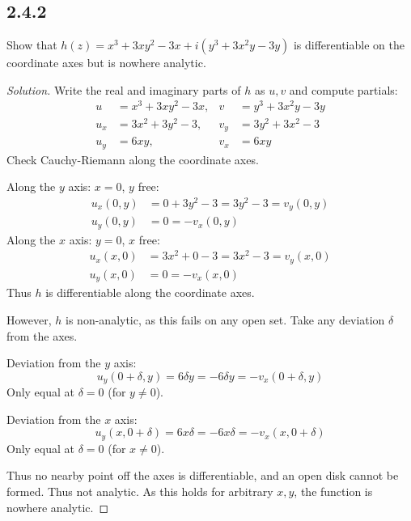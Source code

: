 \documentclass{article}
\newenvironment{solution}{
\begin{proof}[Solution]}{
\end{proof}}
\begin{document}
\subsection*{2.4.2}
Show that $h(z) = x^3 + 3xy^2 - 3x + i(y^3 + 3x^2y - 3y)$ is differentiable on
the coordinate axes but is nowhere analytic.
\begin{solution}
  Write the real and imaginary parts of $h$ as $u, v$ and compute partials:
  \begin{align*}
    u &= x^3 + 3xy^2 - 3x, & v &= y^3 + 3x^2y - 3y
    \\ u_x &= 3x^2 + 3y^2 - 3, & v_y &= 3y^2 + 3x^2 - 3
    \\ u_y &= 6xy, & v_x &= 6xy
  \end{align*}
  Check Cauchy-Riemann along the coordinate axes.

  Along the $y$ axis: $x = 0$, $y$ free:
  \begin{align*}
    u_x(0,y) &= 0 + 3y^2 - 3 = 3y^2 - 3 = v_y(0,y)
    \\ u_y(0,y) &= 0 = -v_x(0,y)
  \end{align*}
  Along the $x$ axis: $y = 0$, $x$ free:
  \begin{align*}
    u_x(x,0) &= 3x^2 + 0 - 3 = 3x^2 - 3 = v_y(x,0)
    \\ u_y(x,0) &= 0 = -v_x(x,0)
  \end{align*}
  Thus $h$ is differentiable along the coordinate axes.

  However, $h$ is non-analytic, as this fails on any open set. Take any deviation
  $\delta$ from the axes.

  Deviation from the $y$ axis:
  \[
    u_y(0 + \delta, y) = 6\delta y = -6\delta y = -v_x(0 + \delta, y)
  \]
  Only equal at $\delta = 0$ (for $y \neq 0$).

  Deviation from the $x$ axis:
  \[
    u_y(x, 0 + \delta) = 6x\delta = -6x\delta = -v_x(x, 0 + \delta)
  \]
  Only equal at $\delta = 0$ (for $x \neq 0$).

  Thus no nearby point off the axes is differentiable, and an open disk cannot be
  formed. Thus not analytic. As this holds for arbitrary $x, y$, the function is
  nowhere analytic.
\end{solution}
\end{document}
